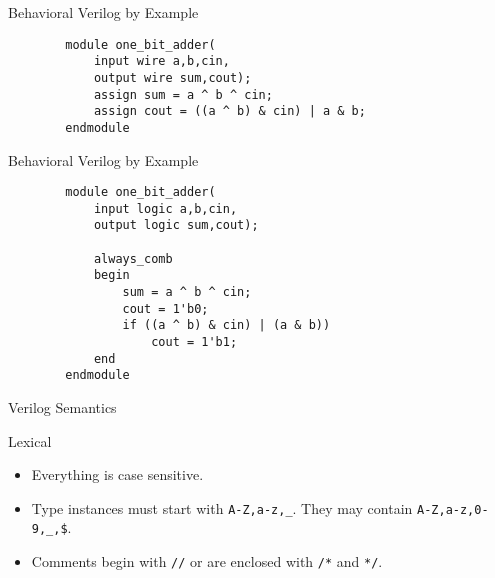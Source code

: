 \documentclass[table,dvipsnames,colorlinks=true]{beamer}
\begin{document}
\begin{frame}[fragile]{Behavioral Verilog by Example}
    \begin{verbatim}
        module one_bit_adder(
            input wire a,b,cin,
            output wire sum,cout);
            assign sum = a ^ b ^ cin;
            assign cout = ((a ^ b) & cin) | a & b;
        endmodule
    \end{verbatim}
\end{frame}

\begin{frame}[fragile]{Behavioral Verilog by Example}
    \begin{verbatim}
        module one_bit_adder(
            input logic a,b,cin,
            output logic sum,cout);
            
            always_comb
            begin
                sum = a ^ b ^ cin;
                cout = 1'b0;
                if ((a ^ b) & cin) | (a & b))
                    cout = 1'b1;
            end
        endmodule
    \end{verbatim}
\end{frame}

\begin{frame}{Verilog Semantics}
    \begin{block}{Lexical}
        \begin{itemize}
            \item Everything is case sensitive.
            \item Type instances must start with \texttt{A-Z,a-z,\_}. They may
                contain \texttt{A-Z,a-z,0-9,\_,\$}. 
            \item Comments begin with \texttt{//} or are enclosed with
                \texttt{/*} and \texttt{*/}.
        \end{itemize}
    \end{block}
\end{frame}
\end{document}
